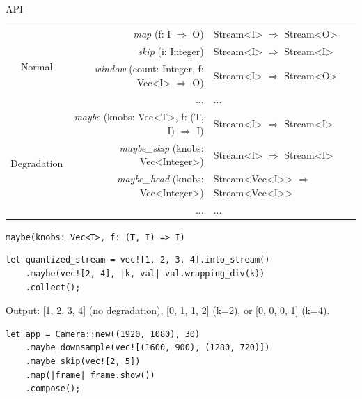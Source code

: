\begin{frame}{API}
  \begin{table}
    \scriptsize
    \begin{tabular}{ c r l }
      \toprule
      \multirow{4}{*}{Normal}
      & \textit{map} (f: I $\Rightarrow$ O) & Stream<I> $\Rightarrow$ Stream<O> \\
      & \textit{skip} (i: Integer) & Stream<I> $\Rightarrow$
                                     Stream<I> \\
      & \textit{window} (count: Integer, f: Vec<I> $\Rightarrow$ O) & Stream<I> $\Rightarrow$
                                                                      Stream<O> \\
      & ... & ... \\
      \midrule
      \multirow{5}{*}{Degradation}
      & \textit{maybe} (knobs: Vec<T>, f:  (T, I) $\Rightarrow$ I) & Stream<I> $\Rightarrow$
                                                                     Stream<I> \\
      & \textit{maybe\_skip} (knobs: Vec<Integer>) & Stream<I> $\Rightarrow$ Stream<I> \\
      & \textit{maybe\_head} (knobs: Vec<Integer>) & Stream<Vec<I>{}> $\Rightarrow$
                                                     Stream<Vec<I>{}> \\
      & ... & ... \\
      \bottomrule
    \end{tabular}
  \end{table}
\end{frame}

\begin{frame}[fragile]{\texttt{maybe(knobs: Vec<T>, f: (T, I) => I)}}
  \begin{lstlisting}
let quantized_stream = vec![1, 2, 3, 4].into_stream()
    .maybe(vec![2, 4], |k, val| val.wrapping_div(k))
    .collect();
  \end{lstlisting}
  Output: [1, 2, 3, 4] (no degradation), [0, 1, 1, 2] (k=2), or [0, 0, 0, 1]
  (k=4).

  \pause
  \vspace{2em}
  \begin{lstlisting}
let app = Camera::new((1920, 1080), 30)
    .maybe_downsample(vec![(1600, 900), (1280, 720)])
    .maybe_skip(vec![2, 5])
    .map(|frame| frame.show())
    .compose();
  \end{lstlisting}

\end{frame}

